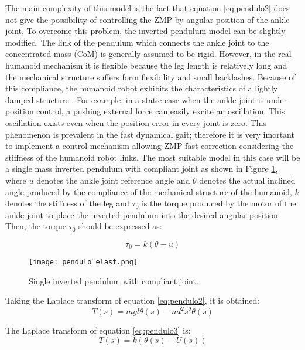 The main complexity of this model is the fact that equation \eqref{eq:pendulo2} does not give the possibility of controlling the ZMP by angular position of the ankle joint. To overcome this problem, the inverted pendulum model can be slightly modified. The link of the pendulum which connects the ankle joint to the concentrated mass (CoM) is generally assumed to be rigid. However, in the real humanoid mechanism it is flexible because the leg length is relatively long and the mechanical structure suffers form flexibility and small backlashes. Because of this compliance, the humanoid robot exhibits the characteristics of a lightly damped structure \cite{Kim2004}. For example, in a static case when the ankle joint is under position control, a pushing external force can easily excite an oscillation. This oscillation exists even when the position error in every joint is zero. This phenomenon is prevalent in the fast dynamical gait; therefore it is very imortant to implement a control mechanism allowing ZMP fast correction considering the stiffness of the humanoid robot links. The most suitable model in this case will be a single mass inverted pendulum with compliant joint as shown in Figure \ref{fig:pendulo_elast}, where $u$ denotes the ankle joint reference angle and $\theta$ denotes the actual inclined angle produced by the compliance of the mechanical structure of the humanoid, $k$ denotes the stiffness of the leg and $\tau_0$ is the torque produced by the motor of the ankle joint to place the inverted pendulum into the desired angular position. Then, the torque $\tau_0$ should be expressed as:

\begin{equation}
\tau_0 = k(\theta - u)
\label{eq:pendulo3}
\end{equation}

\begin{figure}
\centering
\texttt{[image: pendulo\_elast.png]}
\caption{Single inverted pendulum with compliant joint.}
\label{fig:pendulo_elast}
\end{figure}

Taking the Laplace transform of equation \ref{eq:pendulo2}, it is obtained: 
\begin{equation}
T(s) = mgl\theta(s)- ml^2s^2\theta(s) 
\label{eq:par}
\end{equation}

The Laplace transform of equation \eqref{eq:pendulo3} is:
\begin{equation}
T(s) = k(\theta(s) - U(s))
\label{eq:par2}
\end{equation}

